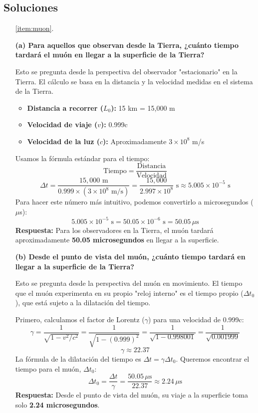 \documentclass[11pt,a4paper]{article}
\begin{document}
\begin{enumerate}
\section*{Soluciones}

\begin{itemize}
    \item[\ref{item:muon}.]

\textbf{(a) Para aquellos que observan desde la Tierra, ¿cuánto tiempo tardará el muón en llegar a la superficie de la Tierra?}

Esto se pregunta desde la perspectiva del observador "estacionario" en la Tierra. El cálculo se basa en la distancia y la velocidad medidas en el sistema de la Tierra.

\begin{itemize}
    \item \textbf{Distancia a recorrer ($L_0$):} 15 km = 15,000 m
    \item \textbf{Velocidad de viaje ($v$):} 0.999c
    \item \textbf{Velocidad de la luz ($c$):} Aproximadamente $3 \times 10^8$ m/s
\end{itemize}
Usamos la fórmula estándar para el tiempo:
\[ \text{Tiempo} = \frac{\text{Distancia}}{\text{Velocidad}} \]
\[ \Delta t = \frac{15,000 \text{ m}}{0.999 \times (3 \times 10^8 \text{ m/s})} = \frac{15,000}{2.997 \times 10^8} \text{ s} \approx 5.005 \times 10^{-5} \text{ s} \]
Para hacer este número más intuitivo, podemos convertirlo a microsegundos ($\mu$s):
\[ 5.005 \times 10^{-5} \text{ s} = 50.05 \times 10^{-6} \text{ s} = 50.05 \, \mu\text{s} \]
\textbf{Respuesta:} Para los observadores en la Tierra, el muón tardará aproximadamente \textbf{50.05 microsegundos} en llegar a la superficie.

\textbf{(b) Desde el punto de vista del muón, ¿cuánto tiempo tardará en llegar a la superficie de la Tierra?}

Esto se pregunta desde la perspectiva del muón en movimiento. El tiempo que el muón experimenta en su propio "reloj interno" es el tiempo propio ($\Delta t_0$), que está sujeto a la dilatación del tiempo.

Primero, calculamos el factor de Lorentz ($\gamma$) para una velocidad de 0.999c:
\[ \gamma = \frac{1}{\sqrt{1 - v^2/c^2}} = \frac{1}{\sqrt{1 - (0.999)^2}} = \frac{1}{\sqrt{1 - 0.998001}} = \frac{1}{\sqrt{0.001999}} \]
\[ \gamma \approx 22.37 \]
La fórmula de la dilatación del tiempo es $\Delta t = \gamma \Delta t_0$. Queremos encontrar el tiempo para el muón, $\Delta t_0$:
\[ \Delta t_0 = \frac{\Delta t}{\gamma} = \frac{50.05 \, \mu\text{s}}{22.37} \approx 2.24 \, \mu\text{s} \]
\textbf{Respuesta:} Desde el punto de vista del muón, su viaje a la superficie toma solo \textbf{2.24 microsegundos}.


\end{itemize}
\end{enumerate}
\end{document}

